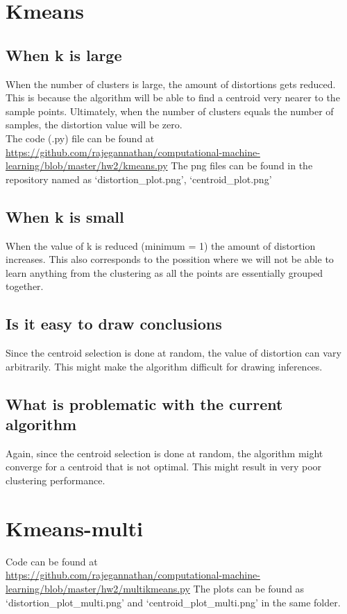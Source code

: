 \documentclass{article}
\begin{document}
\section{Kmeans}
\subsection{When k is large}
When the number of clusters is large, the amount of distortions gets reduced.  This is because the algorithm will be able to find a centroid very nearer to the sample points.  Ultimately, when the number of clusters equals the number of  samples, the distortion value will be zero.\\
       The code (.py) file can be found at \\
       \url{https://github.com/rajegannathan/computational-machine-learning/blob/master/hw2/kmeans.py}
       The png files can be found in the repository named as `distortion\_plot.png', `centroid\_plot.png'
       \subsection{When k is small}
       When the value of k is reduced (minimum = 1) the amount of distortion increases.  This also corresponds to the possition where we will not be able to learn anything from the clustering as all the points are essentially grouped together.
       \subsection{Is it easy to draw conclusions}
       Since the centroid selection is done at random, the value of distortion can vary arbitrarily.  This might make the algorithm difficult for drawing inferences.
      \subsection{What is problematic with the current algorithm}
        Again, since the centroid selection is done at random, the algorithm might converge for a centroid that is not optimal.  This might result in very poor clustering performance.

       \section{Kmeans-multi}
       Code can be found at\\
       \url{https://github.com/rajegannathan/computational-machine-learning/blob/master/hw2/multikmeans.py}
       The plots can be found as `distortion\_plot\_multi.png' and `centroid\_plot\_multi.png' in the same folder.
\end{document}
